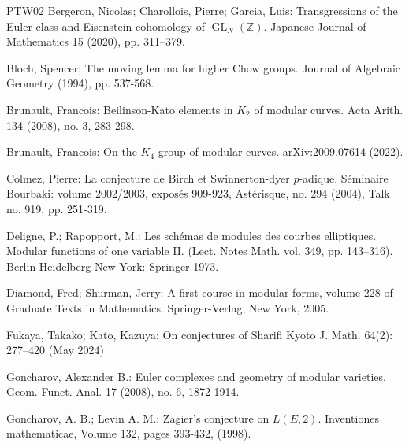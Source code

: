 \documentclass[12pt,amstex,amssymb]{article}
\theoremstyle{plain}
\theoremstyle{definition}
\def\Z{{\mathbb Z}}
\newcommand{\GL}{\operatorname{GL}}
\begin{document}
{\begin{thebibliography}{PTW02}
Bergeron, Nicolas; Charollois, Pierre; Garcia, Luis: Transgressions of the Euler class and Eisenstein cohomology of $\GL_N(\Z)$. Japanese Journal of Mathematics 15 (2020), pp. 311--379.

Bloch, Spencer; The moving lemma for higher Chow groups. Journal of  Algebraic Geometry (1994), pp. 537-568.

Brunault, Francois: Beilinson-Kato elements in $K_2$ of modular curves. Acta Arith. 134 (2008), no. 3, 283-298.

Brunault, Francois: On the $K_4$ group of modular curves. arXiv:2009.07614 (2022).


Colmez, Pierre: La conjecture de Birch et Swinnerton-dyer $p$-adique. 
S\'eminaire Bourbaki: volume 2002/2003, expos\'es 909-923, Ast\'erisque, no. 294 (2004), Talk no. 919, pp. 251-319.


Deligne, P.; Rapopport, M.: Les sch\'emas de modules des courbes elliptiques. Modular functions of one variable II. (Lect. Notes Math. vol. 349, pp. 143--316). Berlin-Heidelberg-New York: Springer 1973.


Diamond, Fred; Shurman, Jerry: 
A first course in modular forms, volume 228
of Graduate Texts in Mathematics. Springer-Verlag, New York, 2005.


Fukaya, Takako; Kato, Kazuya:
On conjectures of Sharifi
Kyoto J. Math. 64(2): 277--420 (May 2024)

Goncharov, Alexander B.: Euler complexes and geometry of modular varieties. Geom. Funct. Anal. 17 (2008), no. 6, 1872-1914.

Goncharov, A. B.; Levin A. M.: Zagier's conjecture on $L(E,2)$. Inventiones mathematicae, Volume 132, pages 393-432, (1998).



\end{thebibliography}}
\end{document}
